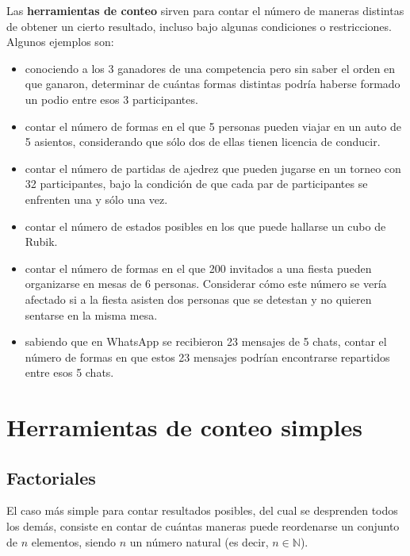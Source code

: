 \documentclass[
  letterpaper,
  DIV=11,
  numbers=noendperiod]{scrreprt}
\providecommand{\tightlist}{%
  \setlength{\itemsep}{0pt}\setlength{\parskip}{0pt}}\usepackage{longtable,booktabs,array}
\begin{document}
Las \textbf{herramientas de conteo} sirven para contar el número de
maneras distintas de obtener un cierto resultado, incluso bajo algunas
condiciones o restricciones. Algunos ejemplos son:

\begin{itemize}
\tightlist
\item
  conociendo a los 3 ganadores de una competencia pero sin saber el
  orden en que ganaron, determinar de cuántas formas distintas podría
  haberse formado un podio entre esos 3 participantes.
\item
  contar el número de formas en el que 5 personas pueden viajar en un
  auto de 5 asientos, considerando que sólo dos de ellas tienen licencia
  de conducir.
\item
  contar el número de partidas de ajedrez que pueden jugarse en un
  torneo con 32 participantes, bajo la condición de que cada par de
  participantes se enfrenten una y sólo una vez.
\item
  contar el número de estados posibles en los que puede hallarse un cubo
  de Rubik.
\item
  contar el número de formas en el que 200 invitados a una fiesta pueden
  organizarse en mesas de 6 personas. Considerar cómo este número se
  vería afectado si a la fiesta asisten dos personas que se detestan y
  no quieren sentarse en la misma mesa.
\item
  sabiendo que en WhatsApp se recibieron 23 mensajes de 5 chats, contar
  el número de formas en que estos 23 mensajes podrían encontrarse
  repartidos entre esos 5 chats.
\end{itemize}

\hypertarget{herramientas-de-conteo-simples}{%
\section{Herramientas de conteo
simples}\label{herramientas-de-conteo-simples}}

\hypertarget{factoriales}{%
\subsection{Factoriales}\label{factoriales}}

El caso más simple para contar resultados posibles, del cual se
desprenden todos los demás, consiste en contar de cuántas maneras puede
reordenarse un conjunto de \(n\) elementos, siendo \(n\) un número
natural (es decir, \(n \in \mathbb{N}\)).
\end{document}
